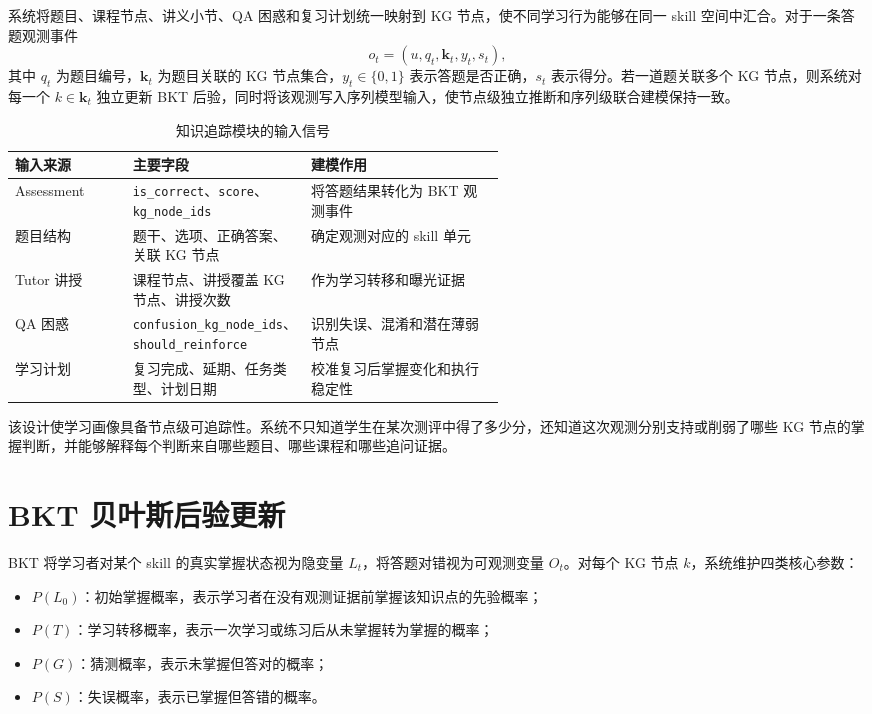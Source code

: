 系统将题目、课程节点、讲义小节、QA 困惑和复习计划统一映射到 KG 节点，使不同学习行为能够在同一 skill 空间中汇合。对于一条答题观测事件
\begin{equation}
  o_t=(u,q_t,\mathbf{k}_t,y_t,s_t),
\end{equation}
其中 $q_t$ 为题目编号，$\mathbf{k}_t$ 为题目关联的 KG 节点集合，$y_t\in\{0,1\}$ 表示答题是否正确，$s_t$ 表示得分。若一道题关联多个 KG 节点，则系统对每一个 $k\in\mathbf{k}_t$ 独立更新 BKT 后验，同时将该观测写入序列模型输入，使节点级独立推断和序列级联合建模保持一致。

\begin{table}[H]
  \centering
  \caption{知识追踪模块的输入信号}
  \label{tab:kt-input-signals}
  \begin{tabularx}{\linewidth}{p{0.24\linewidth}p{0.33\linewidth}X}
    \toprule
    输入来源 & 主要字段 & 建模作用 \\
    \midrule
    Assessment & \texttt{is\_correct}、\texttt{score}、\texttt{kg\_node\_ids} & 将答题结果转化为 BKT 观测事件 \\
    题目结构 & 题干、选项、正确答案、关联 KG 节点 & 确定观测对应的 skill 单元 \\
    Tutor 讲授 & 课程节点、讲授覆盖 KG 节点、讲授次数 & 作为学习转移和曝光证据 \\
    QA 困惑 & \texttt{confusion\_kg\_node\_ids}、\texttt{should\_reinforce} & 识别失误、混淆和潜在薄弱节点 \\
    学习计划 & 复习完成、延期、任务类型、计划日期 & 校准复习后掌握变化和执行稳定性 \\
    \bottomrule
  \end{tabularx}
\end{table}

该设计使学习画像具备节点级可追踪性。系统不只知道学生在某次测评中得了多少分，还知道这次观测分别支持或削弱了哪些 KG 节点的掌握判断，并能够解释每个判断来自哪些题目、哪些课程和哪些追问证据。

\section{BKT 贝叶斯后验更新}

BKT 将学习者对某个 skill 的真实掌握状态视为隐变量 $L_t$，将答题对错视为可观测变量 $O_t$。对每个 KG 节点 $k$，系统维护四类核心参数：
\begin{itemize}
  \item $P(L_0)$：初始掌握概率，表示学习者在没有观测证据前掌握该知识点的先验概率；
  \item $P(T)$：学习转移概率，表示一次学习或练习后从未掌握转为掌握的概率；
  \item $P(G)$：猜测概率，表示未掌握但答对的概率；
  \item $P(S)$：失误概率，表示已掌握但答错的概率。
\end{itemize}

